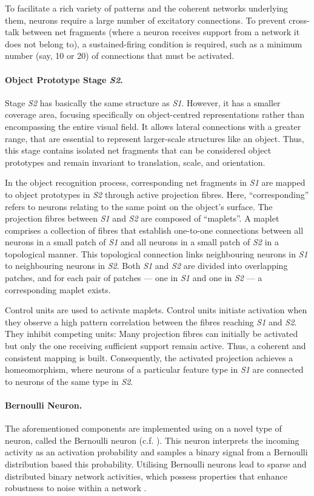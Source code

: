 To facilitate a rich variety of patterns and the coherent networks underlying them, neurons require a large number of excitatory connections. To prevent cross-talk between net fragments (where a neuron receives support from a network it does not belong to), a sustained-firing condition is required, such as a minimum number (say, 10 or 20) of connections that must be activated.

\paragraph{Object Prototype Stage \emph{S2}.} Stage \emph{S2} has basically the same structure as \emph{S1}. However, it has a smaller coverage area, focusing specifically on object-centred representations rather than encompassing the entire visual field. It allows lateral connections with a greater range, that are essential to represent larger-scale structures like an object. 
Thus, this stage contains isolated net fragments that can be considered object prototypes and remain invariant to translation, scale, and orientation.

In the object recognition process, corresponding net fragments in \emph{S1} are mapped to object prototypes in \emph{S2} through active projection fibres. Here, ``corresponding'' refers to neurons relating to the same point on the object's surface.
The projection fibres between \emph{S1} and \emph{S2} are composed of ``maplets''. A maplet comprises a collection of fibres that establish one-to-one connections between all neurons in a small patch of \emph{S1} and all neurons in a small patch of \emph{S2} in a topological manner. This topological connection links neighbouring neurons in \emph{S1} to neighbouring neurons in \emph{S2}. Both \emph{S1} and \emph{S2} are divided into overlapping patches, and for each pair of patches — one in \emph{S1} and one in \emph{S2} — a corresponding maplet exists.

Control units are used to activate maplets.
Control units initiate activation when they observe a high pattern correlation between the fibres reaching \emph{S1} and \emph{S2}. They inhibit competing units: Many projection fibres can initially be activated but only the one receiving sufficient support remain active. Thus, a coherent and consistent mapping is built.
Consequently, the activated projection achieves a homeomorphism, where neurons of a particular feature type in \emph{S1} are connected to neurons of the same type in \emph{S2}.

\paragraph{Bernoulli Neuron.} The aforementioned components are implemented using on a novel type of neuron, called the Bernoulli neuron (c.f. ). This neuron interprets the incoming activity as an activation probability and samples a binary signal from a Bernoulli distribution based this probability. Utilising Bernoulli neurons lead to sparse and distributed binary network activities, which possess properties that enhance robustness to noise within a network .

